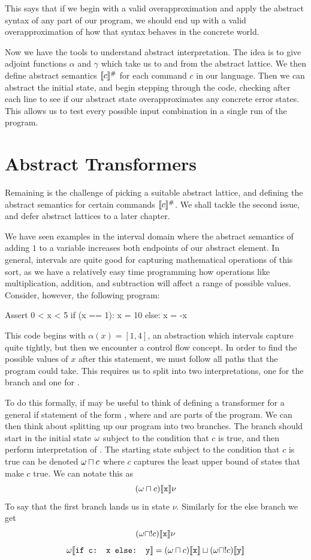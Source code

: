 This says that if we begin with a valid overapproximation and apply the abstract syntax of any part of our program, we should end up with a valid overapproximation of how that syntax behaves in the concrete world.

Now we have the tools to understand abstract interpretation.
The idea is to give adjoint functions $\alpha$ and $\gamma$ which take us to and from the abstract lattice.
We then define abstract semantics $\llbracket c \rrbracket ^\#$ for each command $c$ in our language.
Then we can abstract the initial state, and begin stepping through the code, checking after each line to see if our abstract state overapproximates any concrete error states.
This allows us to test every possible input combination in a single run of the program.

\section{Abstract Transformers}

Remaining is the challenge of picking a suitable abstract lattice, and defining the abstract semantics for certain commands $\llbracket c \rrbracket ^\#$.
We shall tackle the second issue, and defer abstract lattices to a later chapter.

We have seen examples in the interval domain where the abstract semantics of adding $1$ to a variable increases both endpoints of our abstract element.
In general, intervals are quite good for capturing mathematical operations of this sort, as we have a relatively easy time programming how operations like multiplication, addition, and subtraction will affect a range of possible values.
Consider, however, the following program:
\begin{code}
  Assert 0 < x < 5
  if (x == 1):
    x = 10
  else:
    x = -x
\end{code}
This code begins with $\alpha(x) = [1, 4]$, an abstraction which intervals capture quite tightly, but then we encounter a control flow concept.
In order to find the possible values of $x$ after this  statement, we must follow all paths that the program could take. 
This requires us to split into two interpretations, one for the branch  and one for .

To do this formally, if may be useful to think of defining a transformer for a general if statement of the form , where  and  are parts of the program. 
We can then think about splitting up our program into two branches.
The  branch should start in the initial state $\omega$ subject to the condition that $c$ is true, and then perform interpretation of .
The starting state subject to the condition that $c$ is true can be denoted $\omega \sqcap c$ where $c$ captures the least upper bound of states that make $c$ true.
We can notate this as
\[(\omega \sqcap c)\llbracket \texttt{x} \rrbracket\nu \]
To say that the first branch lands us in state $\nu$.
Similarly for the else branch we get 
\[(\omega \sqcap !c)\llbracket \texttt{x} \rrbracket\nu \]
\[\omega \llbracket \texttt{if c: x else: y} \rrbracket = (\omega \sqcap c)\llbracket \texttt{x} \rrbracket \sqcup (\omega \sqcap !c) \llbracket \texttt{y} \rrbracket \]

